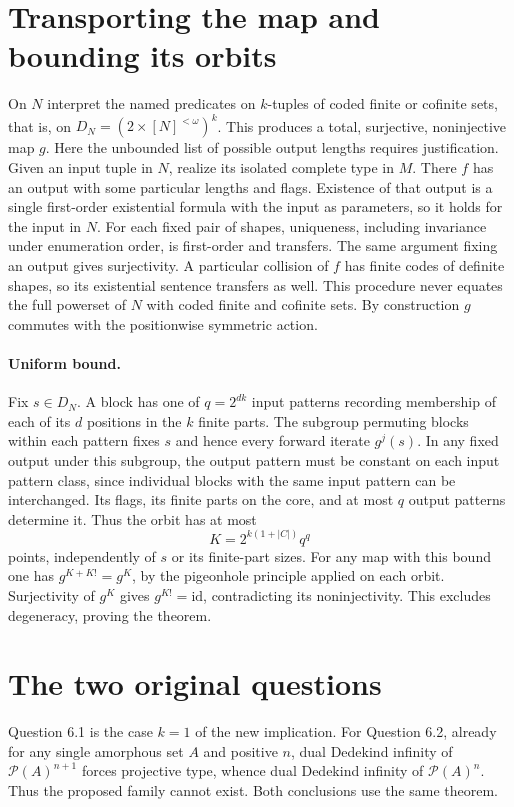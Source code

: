 \documentclass[11pt]{article}
\begin{document}
\section{Transporting the map and bounding its orbits}
On $N$ interpret the named predicates on $k$-tuples of coded finite or cofinite sets, that is, on $D_N=(2\times[N]^{<\omega})^k$. This produces a total, surjective, noninjective map $g$. Here the unbounded list of possible output lengths requires justification. Given an input tuple in $N$, realize its isolated complete type in $M$. There $f$ has an output with some particular lengths and flags. Existence of that output is a single first-order existential formula with the input as parameters, so it holds for the input in $N$. For each fixed pair of shapes, uniqueness, including invariance under enumeration order, is first-order and transfers. The same argument fixing an output gives surjectivity. A particular collision of $f$ has finite codes of definite shapes, so its existential sentence transfers as well. This procedure never equates the full powerset of $N$ with coded finite and cofinite sets. By construction $g$ commutes with the positionwise symmetric action.
\paragraph{Uniform bound.} Fix $s\in D_N$. A block has one of $q=2^{dk}$ input patterns recording membership of each of its $d$ positions in the $k$ finite parts. The subgroup permuting blocks within each pattern fixes $s$ and hence every forward iterate $g^j(s)$. In any fixed output under this subgroup, the output pattern must be constant on each input pattern class, since individual blocks with the same input pattern can be interchanged. Its flags, its finite parts on the core, and at most $q$ output patterns determine it. Thus the orbit has at most
\[
K=2^{k(1+|C|)}q^q
\]
points, independently of $s$ or its finite-part sizes. For any map with this bound one has $g^{K+K!}=g^K$, by the pigeonhole principle applied on each orbit. Surjectivity of $g^K$ gives $g^{K!}=\mathrm{id}$, contradicting its noninjectivity. This excludes degeneracy, proving the theorem.
\section{The two original questions}
Question 6.1 is the case $k=1$ of the new implication. For Question 6.2, already for any single amorphous set $A$ and positive $n$, dual Dedekind infinity of $\mathcal P(A)^{n+1}$ forces projective type, whence dual Dedekind infinity of $\mathcal P(A)^n$. Thus the proposed family cannot exist. Both conclusions use the same theorem.
\end{document}
